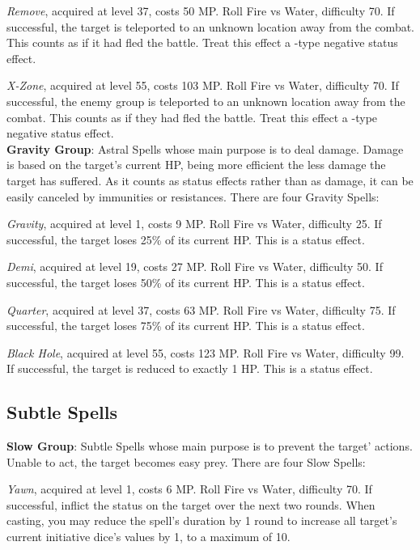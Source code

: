 \begin{multicols}{2}
    \textit{Remove}, acquired at level 37, costs 50 MP\@. Roll Fire vs Water, difficulty 70. If successful, the target is teleported to an unknown location away from the combat. This counts as if it had fled the battle. Treat this effect a -type negative status effect.
    
    \textit{X-Zone}, acquired at level 55, costs 103 MP\@. Roll Fire vs Water, difficulty 70. If successful, the enemy group is teleported to an unknown location away from the combat. This counts as if they had fled the battle. Treat this effect a -type negative status effect.\\%
    
    \textbf{Gravity Group}: Astral Spells whose main purpose is to deal damage. Damage is based on the target’s current HP, being more efficient the less damage the target has suffered. As it counts as status effects rather than as damage, it can be easily canceled by immunities or resistances. There are four Gravity Spells:
    
    \textit{Gravity}, acquired at level 1, costs 9 MP\@. Roll Fire vs Water, difficulty 25. If successful, the target loses 25\% of its current HP\@. This is a  status effect.
    
    \textit{Demi}, acquired at level 19, costs 27 MP\@. Roll Fire vs Water, difficulty 50. If successful, the target loses 50\% of its current HP\@. This is a  status effect.
    
    \textit{Quarter}, acquired at level 37, costs 63 MP\@. Roll Fire vs Water, difficulty 75. If successful, the target loses 75\% of its current HP\@. This is a  status effect.
    
    \textit{Black Hole}, acquired at level 55, costs 123 MP\@. Roll Fire vs Water, difficulty 99. If successful, the target is reduced to exactly 1 HP\@. This is a  status effect.
    
    \subsection{Subtle Spells}\label{subsec:time-subtle}

    \textbf{Slow Group}: Subtle Spells whose main purpose is to prevent the target’ actions. Unable to act, the target becomes easy prey. There are four Slow Spells:
    
    \textit{Yawn}, acquired at level 1, costs 6 MP\@. Roll Fire vs Water, difficulty 70. If successful, inflict the  status on the target over the next two rounds. When casting, you may reduce the spell's duration by 1 round to increase all target's current initiative dice's values by 1, to a maximum of 10.
    

\end{multicols}
